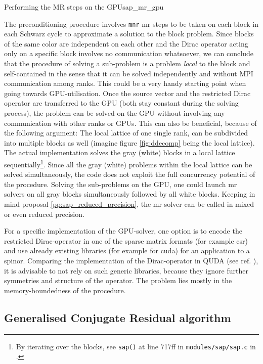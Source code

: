 \documentclass{article}
\theoremstyle{plain} %
\theoremstyle{convention} %
\theoremstyle{remark} %
\def\code#1{\texttt{#1}}
\numberwithin{equation}{section}
\begin{document}
\begin{proposal}{Performing the MR steps on the GPU}{sap_mr_gpu}

The preconditioning procedure involves \code{mnr} \acrfull{mr} steps to be taken on each block in each Schwarz cycle to approximate a solution to the block problem. Since blocks of the same color are independent on each other and the Dirac operator acting only on a specific block involves no communication whatsoever, we can conclude that the procedure of solving a sub-problem is a problem \textit{local} to the block and self-contained in the sense that it can be solved independently and without MPI communication among ranks. This could be a very handy starting point when going towards GPU-utilisation. Once the source vector and the restricted Dirac operator are transferred to the GPU (both stay constant during the solving process), the problem can be solved on the GPU without involving any communication with other ranks or GPUs. This can also be beneficial, because of the following argument: The local lattice of one single rank, can be subdivided into multiple blocks as well (imagine figure \ref{fig:ddecomp} being the local lattice). The actual implementation solves the gray (white) blocks in a local lattice sequentially\footnote{By iterating over the blocks, see \code{sap()} at line \num{717}ff in \code{modules/sap/sap.c} in \cite{openqxd}.}. Since all the gray (white) problems within the local lattice can be solved simultaneously, the code does not exploit the full concurrency potential of the procedure. Solving the sub-problems on the GPU, one could launch \acrshort{mr} solvers on all gray blocks simultaneously followed by all white blocks. Keeping in mind proposal \ref{pp:sap_reduced_precision}, the \acrshort{mr} solver can be called in mixed or even reduced precision.

For a specific implementation of the GPU-solver, one option is to encode the restricted Dirac-operator in one of the sparse matrix formats (for example \acrshort{csr}) and use already existing libraries (for example \cite{bell2008} for \acrshort{cuda}) for an application to a spinor. Comparing the implementation of the Dirac-operator in QUDA (see ref. \cite{clark2010}), it is advisable to not rely on such generic libraries, because they ignore further symmetries and structure of the operator. The problem lies mostly in the memory-boundedness of the procedure.

\end{proposal}

\subsection{Generalised Conjugate Residual algorithm}
\end{document}
